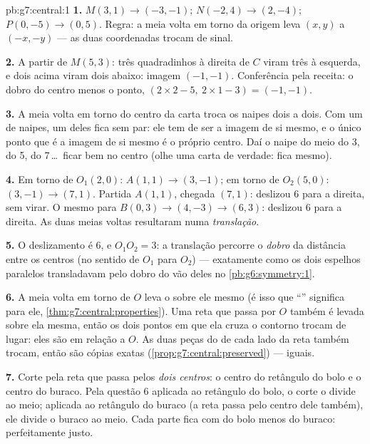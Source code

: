 \begin{solution}{pb:g7:central:1}
\textbf{1.} $M(3, 1) \to (-3, -1)$; $N(-2, 4) \to (2, -4)$;
$P(0, -5) \to (0, 5)$. Regra: a meia volta em torno da origem leva
$(x, y)$ a $(-x, -y)$ --- as duas coordenadas trocam de sinal.

\textbf{2.} A partir de $M(5, 3)$: três quadradinhos à direita de $C$
viram três à esquerda, e dois acima viram dois abaixo: imagem
$(-1, -1)$. Conferência pela receita: o dobro do centro menos o ponto,
$(2 \times 2 - 5,\ 2 \times 1 - 3) = (-1, -1)$.

\textbf{3.} A meia volta em torno do centro da carta troca os naipes
dois a dois. Com um  de naipes, um deles fica sem par: ele
tem de ser a imagem de si mesmo, e o único ponto que é a imagem de si
mesmo é o próprio centro. Daí o naipe do meio do 3, do 5, do
7\,\dots\ ficar bem no centro (olhe uma carta de verdade: fica mesmo).

\textbf{4.} Em torno de $O_1(2,0)$: $A(1,1) \to (3,-1)$; em torno de
$O_2(5,0)$: $(3,-1) \to (7,1)$. Partida $A(1,1)$, chegada $(7,1)$:
deslizou $6$ para a direita, sem virar. O mesmo para
$B(0,3) \to (4,-3) \to (6,3)$: deslizou $6$ para a direita. As duas
meias voltas resultaram numa \emph{translação}.

\textbf{5.} O deslizamento é $6$, e $O_1 O_2 = 3$: a translação percorre
o \emph{dobro} da distância entre os centros (no sentido de $O_1$ para
$O_2$) --- exatamente como os dois espelhos paralelos transladavam pelo
dobro do vão deles no \cref{pb:g6:symmetry:1}.

\textbf{6.} A meia volta em torno de $O$ leva o  sobre ele
mesmo (é isso que ``'' significa para ele,
\cref{thm:g7:central:properties}). Uma reta que passa por $O$ também é
levada sobre ela mesma, então os dois pontos em que ela cruza o
contorno trocam de lugar: eles são  em relação a $O$. As duas
peças do  de cada lado da reta também trocam, então são
cópias exatas (\cref{prop:g7:central:preserved}) ---  iguais.

\textbf{7.} Corte pela reta que passa pelos \emph{dois centros}: o
centro do retângulo do bolo e o centro do buraco. Pela questão 6
aplicada ao retângulo do bolo, o corte o divide ao meio; aplicada ao
retângulo do buraco (a reta passa pelo centro dele também), ele divide
o buraco ao meio. Cada parte fica com  do bolo menos  do
buraco: perfeitamente justo.


\end{solution}
